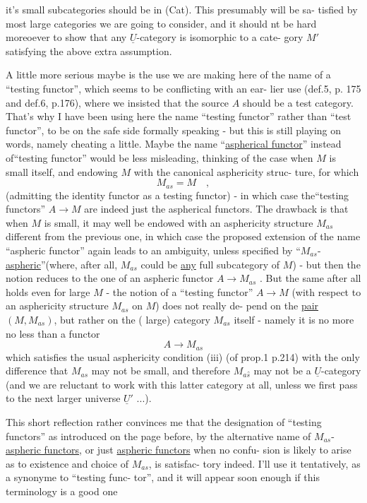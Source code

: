 it's small subcategories should be in (Cat). This presumably will be sa-%
tisfied by most large categories we are going to consider, and it should
nt be hard moreoever to show that any $\underline{U}$-category is isomorphic to a cate-%
gory $M'$ satisfying the above extra assumption.

A little more serious maybe is the use we are making here of the
name of a ``testing functor'', which seems to be conflicting with an ear-%
lier use (def.5, p. 175 and def.6, p.176), where we insisted  that
the source $A$ should be a test category. That's why I have been using
here the name ``testing functor'' rather than ``test functor'', to be on
the safe side formally speaking - but this is still playing on words,
namely cheating a little. Maybe the name ``\uline{aspherical functor}'' instead
of``testing functor'' would be less misleading, thinking of the case when
$M$ is small itself, and endowing $M$ with the canonical asphericity struc-%
ture, for which
\[ M_{as} = M \quad , \]
(admitting the identity functor as a testing functor) - in which case
the``testing functors'' $A \to M$ are indeed just the aspherical functors.
The drawback is that when $M$ is small,  it may well be endowed with
an asphericity structure $M_{as}$ different from the previous one, in which
case the proposed extension of the name ``aspheric functor'' again leads to
an ambiguity, unless specified by ``$M_{as}$-\uline{aspheric}''(where, after all,
$M_{as}$ could be \uline{any} full subcategory of $M$) - but then the notion reduces
to the one of an aspheric functor $A \to M_{as}$ . But the same after all
holds even for large $M$ - the notion of a ``testing functor'' $A \to M$
(with respect to an asphericity structure $M_{as}$ on $M$) does not really de-%
pend on the \uline{pair} $(M,M_{as})$, but rather on the ( large) category
$M_{as}$ itself - namely it is no more no less than a functor
\[ A \to M_{as} \]
which satisfies the usual asphericity condition (iii) (of prop.1 p.214)\hand{,}
with the only difference that $M_{as}$ may not be small, and therefore 
$M_{as}\hat{}$ may not be a $\underline{U}$-category (and we are  reluctant to work with this
latter category at all, unless we first pass to the next larger universe
$\underline{U}'$ ...).

This short reflection rather convinces me that the designation of
``testing functors'' as introduced on the page before, by the alternative
name of $M_{as}$-\uline{aspheric functors}, or just \uline{aspheric functors} when no confu-%
sion is likely to arise as to existence and choice of $M_{as}$, is satisfac-%
tory indeed. I'll use it tentatively, as a synonyme to ``testing func-%
tor'', and it will appear soon enough if this terminology is a good one
